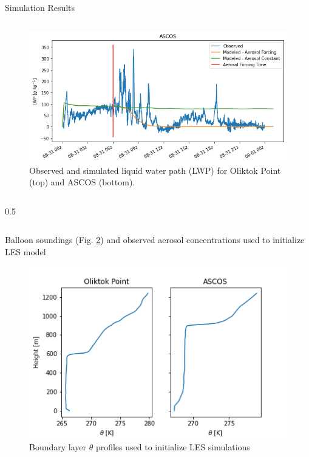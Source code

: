 \documentclass[final]{beamer}
\newlength{\sepwid}
\newlength{\twocolwid}
\begin{document}
\begin{frame}[t]
\begin{columns}[t]
\begin{column}{\twocolwid}
\begin{alertblock}{Simulation Results}
\begin{column}{0.59\linewidth}
\begin{figure}
				\includegraphics[width=\linewidth]{images/ascos_lwp.png}
				\caption{Observed and simulated liquid water path (LWP) for Oliktok Point (top) and ASCOS (bottom).}\label{fig:simulations}
			\end{figure}
		\end{column}
		\begin{column}{0.5\sepwid}\end{column}
		\begin{column}{0.39\linewidth}
			Balloon soundings (Fig. \ref{fig:theta}) and observed aerosol concentrations used to initialize LES model
			\begin{figure}
				\centering
				\includegraphics[width=0.8\linewidth]{images/bl_profile.png}
				\caption{Boundary layer $\theta$ profiles used to initialize LES simulations}\label{fig:theta}
			\end{figure}
			

\end{column}
\end{alertblock}
\end{column}
\end{columns}
\end{frame}
\end{document}
